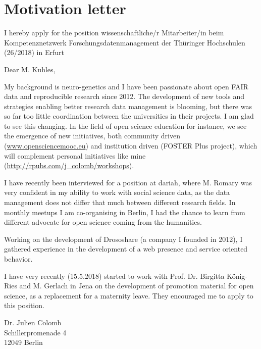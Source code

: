 \section* {Motivation letter}

I hereby apply for the position wissenschaftliche/r Mitarbeiter/in beim Kompetenznetzwerk Forschungsdatenmanagement der Th\"{u}ringer Hochschulen (26/2018) in Erfurt

\vspace {0.5cm} 

Dear M.  Kuhles,

My background is neuro-genetics and I have been passionate about open FAIR data and reproducible research since 2012. The development of new tools and strategies enabling better research data management is blooming, but there was so far too little coordination between the universities in their projects. I am glad to see this changing. 
%
In the field of open science education for instance, we see the emergence of new initiatives, both community driven (\url{www.opensciencemooc.eu}) and institution driven (FOSTER Plus project), which will complement personal initiatives like mine (\url{http://rpubs.com/j_colomb/workshops}).

I have recently been interviewed for a position at dariah, where M. Romary was very confident in my ability to work with social science data, as the data management does not differ that much between different research fields. In monthly meetups I am co-organising in Berlin, I had the chance to learn from different advocate for open science coming from the humanities.

Working on the development of Drososhare (a company I founded in 2012), I gathered experience in the development of a web presence and service oriented behavior.

I have very recently (15.5.2018) started to work with Prof. Dr. Birgitta K\"{o}nig-Ries and M. Gerlach in Jena on the development of promotion material for open science, as a replacement for a maternity leave. They encouraged me to apply to this position.


Dr. Julien Colomb
\\
Schillerpromenade 4
\\
12049 Berlin




\newpage





%
% 


\newpage 

